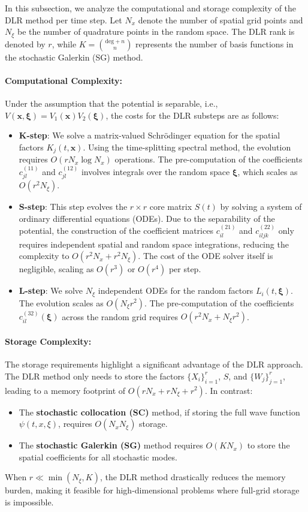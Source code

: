 \documentclass[preprint,11pt]{elsarticle}
\begin{document}
In this subsection, we analyze the computational and storage complexity of the DLR method per time step. Let $N_x$ denote the number of spatial grid points and $N_{\xi}$ be the number of quadrature points in the random space. The DLR rank is denoted by $r$, while $K = \binom{\text{deg}+n}{n}$ represents the number of basis functions in the stochastic Galerkin (SG) method.

\paragraph{Computational Complexity:}
Under the assumption that the potential is separable, i.e., $V(\bm{x}, \bm{\xi}) = V_1(\bm{x})V_2(\bm{\xi})$, the costs for the DLR substeps are as follows:
\begin{itemize}
    \item \textbf{K-step}: We solve a matrix-valued Schrödinger equation for the spatial factors $K_j(t, \bm{x})$. Using the time-splitting spectral method, the evolution requires $O(r N_x \log N_x)$ operations. The pre-computation of the coefficients $c_{jl}^{(11)}$ and $c_{jl}^{(12)}$ involves integrals over the random space $\bm{\xi}$, which scales as $O(r^2 N_{\xi})$.
    \item \textbf{S-step}: This step evolves the $r \times r$ core matrix $S(t)$ by solving a system of ordinary differential equations (ODEs). Due to the separability of the potential, the construction of the coefficient matrices $c_{il}^{(21)}$ and $c_{iljk}^{(22)}$ only requires independent spatial and random space integrations, reducing the complexity to $O(r^2 N_x + r^2 N_{\xi})$. The cost of the ODE solver itself is negligible, scaling as $O(r^3)$ or $O(r^4)$ per step.
    \item \textbf{L-step}: We solve $N_{\xi}$ independent ODEs for the random factors $L_i(t, \bm{\xi})$. The evolution scales as $O(N_{\xi} r^2)$. The pre-computation of the coefficients $c_{il}^{(32)}(\bm{\xi})$ across the random grid requires $O(r^2 N_x + N_{\xi} r^2)$.
\end{itemize}

\paragraph{Storage Complexity:}
The storage requirements highlight a significant advantage of the DLR approach. The DLR method only needs to store the factors $\{X_i\}_{i=1}^r$, $S$, and $\{W_j\}_{j=1}^r$, leading to a memory footprint of $O(r N_x + r N_{\xi} + r^2)$. In contrast:
\begin{itemize}
    \item The \textbf{stochastic collocation (SC)} method, if storing the full wave function $\psi(t, x, \xi)$, requires $O(N_x N_{\xi})$ storage.
    \item The \textbf{stochastic Galerkin (SG)} method requires $O(K N_x)$ to store the spatial coefficients for all stochastic modes.
\end{itemize}
When $r \ll \min(N_{\xi}, K)$, the DLR method drastically reduces the memory burden, making it feasible for high-dimensional problems where full-grid storage is impossible.
\end{document}
